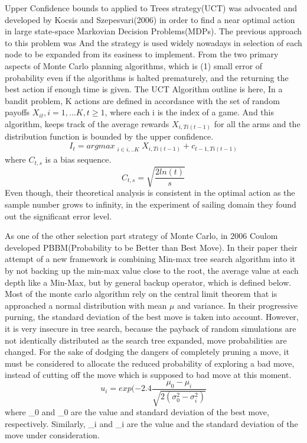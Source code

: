 
Upper Confidence bounds to applied to Trees strategy(UCT) was advocated and developed by Kocsis and Szepesvari(2006) in order to find a near optimal action in large state-space Markovian Decision Problems(MDPs). The previous approach to this problem was 
And the strategy is used widely nowadays in selection of each node to be expanded from its easiness to implement.
From the two primary aspects of Monte Carlo planning algorithms, which is (1) small error of probability even if the algorithms is halted prematurely, and the returning the best action if enough time is given. The UCT Algorithm outline is here, In a bandit problem, K actions are defined in accordance with the set of random payoffs \(X_{it}, i = 1, ... K, t\geq 1\), where each i is the index of a game. And this algorithm, keeps track of the average rewards \(X_{i, Ti(t-1)}\) for all the arms and the distribution function is bounded by the upper confidence. 
\[ I_{t} = argmax_{\substack{i \in{i, .. K}}} {X_{i, Ti(t-1)} + c_{t-1, Ti(t-1)}}\]
where \(C_{t, s}\) is a bias sequence.
\[C_{t, s} = \sqrt{\frac{2ln(t)}{s}}\]
Even though, their theoretical analysis is consistent in the optimal action as the sample number grows to infinity, in the experiment of sailing domain they found out the significant error level. 

As one of the other selection part strategy of Monte Carlo, in 2006 Coulom developed PBBM(Probability to be Better than Best Move). In their paper their attempt of a new framework is combining Min-max tree search algorithm into it by not backing up the min-max value close to the root, the average value at each depth like a Min-Max, but by general backup operator, which is defined below. 
Most of the monte carlo algorithm rely on the central limit theorem that is approached a normal distribution with mean \(\mu\) and variance. In their progressive purning, the standard deviation of the best move is taken into account. However, it is very insecure in tree search, because the payback of random simulations are not identically distributed as the search tree expanded, move probabilities are changed. For the sake of dodging the dangers of completely pruning a move, it must be considered to allocate the reduced probability of exploring a bad move, instead of cutting off the move which is supposed to bad move at this moment.   
\[u_{i} = exp(-2.4\frac{\mu_{0} - \mu_{i}}{\sqrt{2(\sigma^2_{0} - \sigma^2_{i})}}\]
where \mu_{0} and \sigma_{0} are the value and standard deviation of the best move, respectively. Similarly, \mu_{i} and \sigma_{i} are the value and the standard deviation of the move under consideration.

